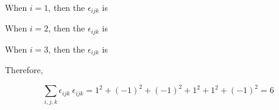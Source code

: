 \documentclass[a4paper]{article}
\begin{document}
When $i = 1$, then the $\epsilon_{ijk}$ is \\

\begin{center}
\vspace*{1 cm}
\end{center}


When $i = 2$, then the $\epsilon_{ijk}$ is \\

\begin{center}
\vspace*{1 cm}
\end{center}


When $i = 3$, then the $\epsilon_{ijk}$ is \\

\begin{center}
\vspace*{1 cm}
\end{center}

Therefore,

\begin{equation*}
  \sum_{i,j,k} \epsilon_{ijk} \ \epsilon_{ijk} = 1^2 + (-1)^2 + (-1)^2 + 1^2 + 1^2 + (-1)^2 = 6
\end{equation*}
\end{document}

